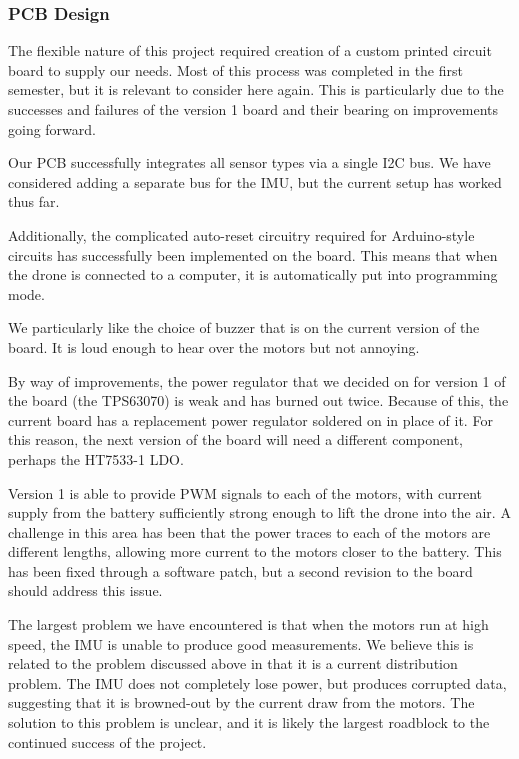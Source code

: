 \documentclass[12pt, titlepage]{article}
\begin{document}
\subsubsection{PCB Design}

The flexible nature of this project required creation of a custom printed circuit board to supply our needs. Most of this process was completed in the first semester, but it is relevant to consider here again. This is particularly due to the successes and failures of the version 1 board and their bearing on improvements going forward.

Our PCB successfully integrates all sensor types via a single I2C bus. We have considered adding a separate bus for the IMU, but the current setup has worked thus far.

Additionally, the complicated auto-reset circuitry required for Arduino-style circuits has successfully been implemented on the board. This means that when the drone is connected to a computer, it is automatically put into programming mode. 

We particularly like the choice of buzzer that is on the current version of the board. It is loud enough to hear over the motors but not annoying.

By way of improvements, the power regulator that we decided on for version 1 of the board (the TPS63070) is weak and has burned out twice. Because of this, the current board has a replacement power regulator soldered on in place of it. For this reason, the next version of the board will need a different component, perhaps the HT7533-1 LDO.

Version 1 is able to provide PWM signals to each of the motors, with current supply from the battery sufficiently strong enough to lift the drone into the air. A challenge in this area has been that the power traces to each of the motors are different lengths, allowing more current to the motors closer to the battery. This has  been fixed through a software patch, but a second revision to the board should address this issue.

The largest problem we have encountered is that when the motors run at high speed, the IMU is unable to produce good measurements. We believe this is related to the problem discussed above in that it is a current distribution problem. The IMU does not completely lose power, but produces corrupted data, suggesting that it is browned-out by the current draw from the motors. The solution to this problem is unclear, and it is likely the largest roadblock to the continued success of the project.
\end{document}
